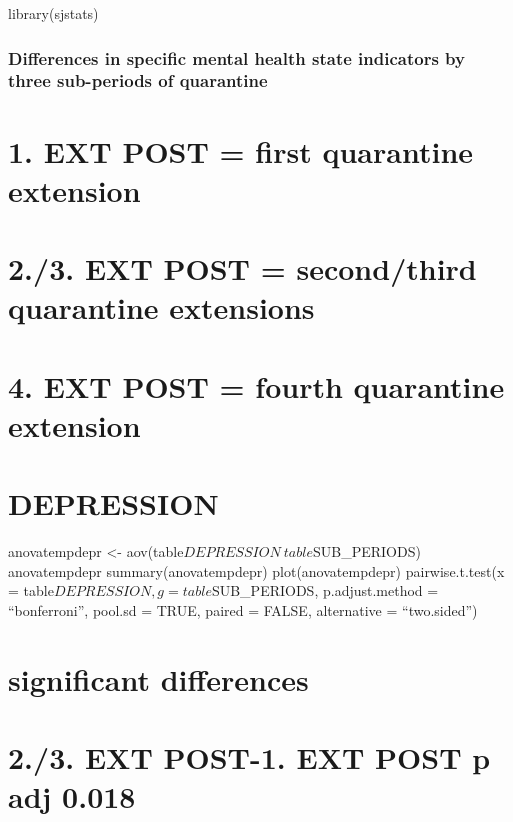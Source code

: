 \documentclass[
]{book}
\begin{document}
library(sjstats)

\hypertarget{differences-in-specific-mental-health-state-indicators-by-three-sub-periods-of-quarantine}{%
\subsection{Differences in specific mental health state indicators by three sub-periods of quarantine}\label{differences-in-specific-mental-health-state-indicators-by-three-sub-periods-of-quarantine}}

\hypertarget{ext-post-first-quarantine-extension}{%
\chapter{1. EXT POST = first quarantine extension}\label{ext-post-first-quarantine-extension}}

\hypertarget{ext-post-secondthird-quarantine-extensions}{%
\chapter{2./3. EXT POST = second/third quarantine extensions}\label{ext-post-secondthird-quarantine-extensions}}

\hypertarget{ext-post-fourth-quarantine-extension}{%
\chapter{4. EXT POST = fourth quarantine extension}\label{ext-post-fourth-quarantine-extension}}

\hypertarget{depression-1}{%
\chapter{DEPRESSION}\label{depression-1}}

anovatempdepr \textless- aov(table\(DEPRESSION~table\)SUB\_PERIODS)
anovatempdepr
summary(anovatempdepr)
plot(anovatempdepr)
pairwise.t.test(x = table\(DEPRESSION, g = table\)SUB\_PERIODS, p.adjust.method = ``bonferroni'', pool.sd = TRUE, paired = FALSE, alternative = ``two.sided'')

\hypertarget{significant-differences}{%
\chapter{significant differences}\label{significant-differences}}

\hypertarget{ext-post-1.-ext-post-p-adj-0.018}{%
\chapter{2./3. EXT POST-1. EXT POST p adj 0.018}\label{ext-post-1.-ext-post-p-adj-0.018}}
\end{document}
